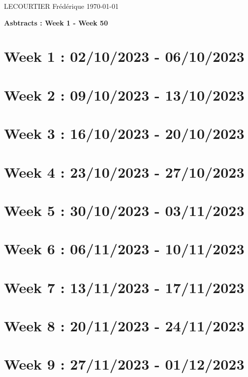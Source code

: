 \documentclass[french]{article}
\begin{document}
	LECOURTIER Frédérique \hfill \today
	\begin{center}
		\Large\textbf{{Asbtracts : Week 1 - Week 50}}
	\end{center}

	\section{Week 1 : 02/10/2023 - 06/10/2023}
	

	\section{Week 2 : 09/10/2023 - 13/10/2023}
	

	\section{Week 3 : 16/10/2023 - 20/10/2023}
	

	\section{Week 4 : 23/10/2023 - 27/10/2023}
	

	\section{Week 5 : 30/10/2023 - 03/11/2023}
	

	\section{Week 6 : 06/11/2023 - 10/11/2023}
	

	\section{Week 7 : 13/11/2023 - 17/11/2023}
	

	\section{Week 8 : 20/11/2023 - 24/11/2023}
	

	\section{Week 9 : 27/11/2023 - 01/12/2023}
	
\end{document}
